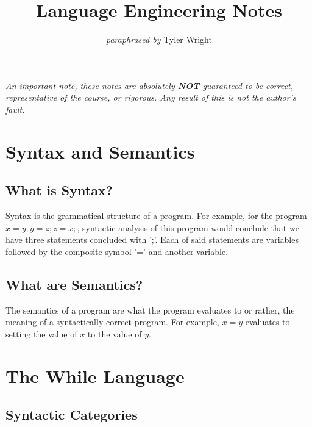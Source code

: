 \documentclass[a4paper, 12pt, twoside]{article}
\begin{document}
\title{Language Engineering Notes}
\date{}
\author{\textit{paraphrased by} Tyler Wright}
\maketitle

\vfill

\textit{An important note, these notes are absolutely \textbf{NOT}
  guaranteed to be correct, representative of the course, or rigorous.
  Any result of this is not the author's fault.}

\newpage

\section{Syntax and Semantics}

\subsection{What is Syntax?}

Syntax is the grammatical structure of a program. For example,
for the program $x=y;y=z;z=x;$, syntactic analysis of this 
program would conclude that we have three statements concluded
with ';'. Each of said statements are variables followed by
the composite symbol '=' and another variable.

\subsection{What are Semantics?}

The semantics of a program are what the program evaluates
to or rather, the meaning of a syntactically correct program.
For example, $x=y$ evaluates to setting the value of $x$ to the 
value of $y$.

\section{The While Language}

\subsection{Syntactic Categories}
\end{document}
